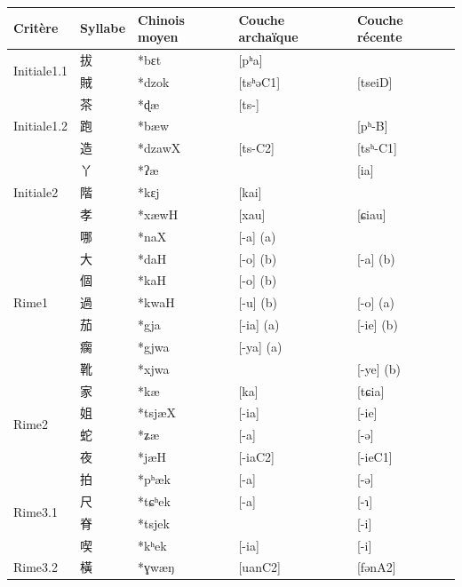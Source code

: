 \documentclass{scrbook}
\newcounter{c}[subsubsection]
\begin{document}
\begin{sloppypar}
\begin{table}[htbp]
  \centering
    \begin{tabular}{lllll}
    \toprule
    Critère & Syllabe & Chinois moyen  & Couche archaïque & Couche récente \\
    \midrule
    \multirow{2}[2]{*}{Initiale1.1} & 拔     & *bɛt  & [pʰa] &  \\
         & 賊     & *dzok & [tsʰəC1] & [tseiD] \\
    \midrule
    \multirow{3}[2]{*}{Initiale1.2} & 茶     & *ɖæ   & [ts-] &  \\
          & 跑     & *bæw  &       & [pʰ-B] \\
          & 造     & *dzawX & [ts-C2] & [tsʰ-C1] \\
    \midrule
    \multirow{3}[2]{*}{Initiale2} & 丫     & *ʔæ   &       & [ia] \\
          & 階     & *kɛj  & [kai] &  \\
          & 孝     & *xæwH & [xau] & [ɕiau] \\
    \midrule
    \multirow{7}[2]{*}{Rime1} & 哪 & *naX  & [-a] (a) &  \\
          & 大 & *daH  & [-o] (b) & [-a] (b) \\
          & 個     & *kaH  & [-o] (b) &  \\
          & 過     & *kwaH & [-u] (b) & [-o] (a) \\
          & 茄     & *gja  & [-ia] (a) & [-ie] (b) \\
          & 瘸     & *gjwa & [-ya] (a) &  \\
          & 靴     & *xjwa &       & [-ye] (b) \\
    \midrule
    \multirow{4}[2]{*}{Rime2} & 家     & *kæ   & [ka]  & [tɕia] \\
          & 姐     & *tsjæX & [-ia] & [-ie] \\
          & 蛇     & *ʑæ   & [-a]  & [-ə] \\
          & 夜     & *jæH  & [-iaC2] & [-ieC1] \\
    \midrule
    \multirow{4}[2]{*}{Rime3.1} & 拍     & *pʰæk & [-a]  & [-ə] \\
          & 尺     & *tɕʰek & [-a]  & [-ɿ] \\
          & 脊     & *tsjek &       & [-i] \\
          & 喫     & *kʰek & [-ia] & [-i] \\
    \midrule
    \multirow{4}[2]{*}{Rime3.2} & 橫     & *ɣwæŋ & [uanC2] & [fənA2] \\

\end{tabular}
\end{table}
\end{sloppypar}
\end{document}
